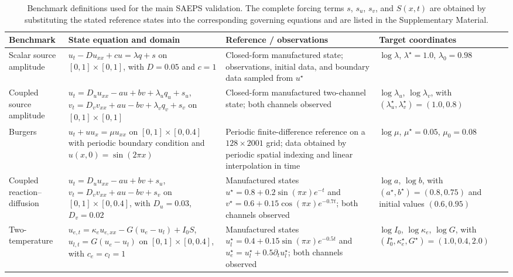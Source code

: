 \documentclass[preprint,12pt]{elsarticle}
\begin{document}
\begin{table}[H]
\centering
\begin{threeparttable}
\renewcommand{\tabcolsep}{4pt}
\renewcommand{\arraystretch}{1.08}
\scriptsize
\begin{tabular}{@{}p{}p{}p{}p{}@{}}
\toprule
Benchmark & State equation and domain & Reference / observations & Target coordinates \\
\midrule
Scalar source amplitude & $u_t-Du_{xx}+cu=\lambda q+s$ on $[0,1]\times[0,1]$, with $D=0.05$ and $c=1$ & Closed-form manufactured state; observations, initial data, and boundary data sampled from $u^\star$ & $\log\lambda$, $\lambda^\star=1.0$, $\lambda_0=0.98$ \\
Coupled source amplitude & $u_t=D_u u_{xx}-au+bv+\lambda_u q_u+s_u$, $v_t=D_v v_{xx}+au-bv+\lambda_v q_v+s_v$ on $[0,1]\times[0,1]$ & Closed-form manufactured two-channel state; both channels observed & $\log\lambda_u$, $\log\lambda_v$, with $(\lambda_u^\star,\lambda_v^\star)=(1.0,0.8)$ \\
Burgers & $u_t+u u_x=\mu u_{xx}$ on $[0,1]\times[0,0.4]$ with periodic boundary condition and $u(x,0)=\sin(2\pi x)$ & Periodic finite-difference reference on a $128\times2001$ grid; data obtained by periodic spatial indexing and linear interpolation in time & $\log\mu$, $\mu^\star=0.05$, $\mu_0=0.08$ \\
Coupled reaction--diffusion & $u_t=D_u u_{xx}-au+bv+s_u$, $v_t=D_v v_{xx}+au-bv+s_v$ on $[0,1]\times[0,0.4]$, with $D_u=0.03$, $D_v=0.02$ & Manufactured states $u^\star=0.8+0.2\sin(\pi x)e^{-t}$ and $v^\star=0.6+0.15\cos(\pi x)e^{-0.7t}$; both channels observed & $\log a$, $\log b$, with $(a^\star,b^\star)=(0.8,0.75)$ and initial values $(0.6,0.95)$ \\
Two-temperature & $u_{e,t}=\kappa_e u_{e,xx}-G(u_e-u_l)+I_0S$, $u_{l,t}=G(u_e-u_l)$ on $[0,1]\times[0,0.4]$, with $c_e=c_l=1$ & Manufactured states $u_l^\star=0.4+0.15\sin(\pi x)e^{-0.5t}$ and $u_e^\star=u_l^\star+0.5\partial_tu_l^\star$; both channels observed & $\log I_0$, $\log\kappa_e$, $\log G$, with $(I_0^\star,\kappa_e^\star,G^\star)=(1.0,0.4,2.0)$ \\
\bottomrule
\end{tabular}
\caption{Benchmark definitions used for the main SAEPS validation.  The complete forcing terms $s$, $s_u$, $s_v$, and $S(x,t)$ are obtained by substituting the stated reference states into the corresponding governing equations and are listed in the Supplementary Material.}
\label{tab:benchmark_protocol}
\end{threeparttable}
\end{table}
\FloatBarrier
\end{document}
